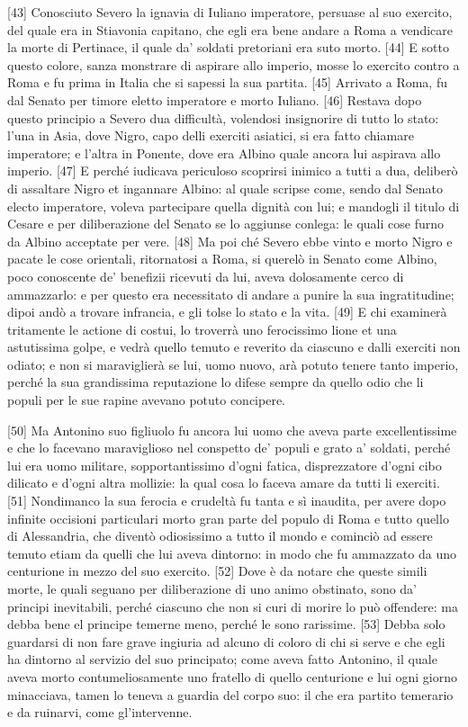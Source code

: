{[}43{]} Conosciuto Severo la ignavia di Iuliano imperatore, persuase al
suo exercito, del quale era in Stiavonia capitano, che egli era bene
andare a Roma a vendicare la morte di Pertinace, il quale da' soldati
pretoriani era suto morto. {[}44{]} E sotto questo colore, sanza
monstrare di aspirare allo imperio, mosse lo exercito contro a Roma e fu
prima in Italia che si sapessi la sua partita. {[}45{]} Arrivato a Roma,
fu dal Senato per timore eletto imperatore e morto Iuliano. {[}46{]}
Restava dopo questo principio a Severo dua difficultà, volendosi
insignorire di tutto lo stato: l'una in Asia, dove Nigro, capo delli
exerciti asiatici, si era fatto chiamare imperatore; e l'altra in
Ponente, dove era Albino quale ancora lui aspirava allo imperio.
{[}47{]} E perché iudicava periculoso scoprirsi inimico a tutti a dua,
deliberò di assaltare Nigro et ingannare Albino: al quale scripse come,
sendo dal Senato electo imperatore, voleva partecipare quella dignità
con lui; e mandogli il titulo di Cesare e per diliberazione del Senato
se lo aggiunse conlega: le quali cose furno da Albino acceptate per
vere. {[}48{]} Ma poi ché Severo ebbe vinto e morto Nigro e pacate le
cose orientali, ritornatosi a Roma, si querelò in Senato come Albino,
poco conoscente de' benefizii ricevuti da lui, aveva dolosamente cerco
di ammazzarlo: e per questo era necessitato di andare a punire la sua
ingratitudine; dipoi andò a trovare infrancia, e gli tolse lo stato e la
vita. {[}49{]} E chi examinerà tritamente le actione di costui, lo
troverrà uno ferocissimo lione et una astutissima golpe, e vedrà quello
temuto e reverito da ciascuno e dalli exerciti non odiato; e non si
maraviglierà se lui, uomo nuovo, arà potuto tenere tanto imperio, perché
la sua grandissima reputazione lo difese sempre da quello odio che li
populi per le sue rapine avevano potuto concipere.

{[}50{]} Ma Antonino suo figliuolo fu ancora lui uomo che aveva parte
excellentissime e che lo facevano maraviglioso nel conspetto de' populi
e grato a' soldati, perché lui era uomo militare, sopportantissimo
d'ogni fatica, disprezzatore d'ogni cibo dilicato e d'ogni altra
mollizie: la qual cosa lo faceva amare da tutti li exerciti. {[}51{]}
Nondimanco la sua ferocia e crudeltà fu tanta e sì inaudita, per avere
dopo infinite occisioni particulari morto gran parte del populo di Roma
e tutto quello di Alessandria, che diventò odiosissimo a tutto il mondo
e cominciò ad essere temuto etiam da quelli che lui aveva dintorno: in
modo che fu ammazzato da uno centurione in mezzo del suo exercito.
{[}52{]} Dove è da notare che queste simili morte, le quali seguano per
diliberazione di uno animo obstinato, sono da' principi inevitabili,
perché ciascuno che non si curi di morire lo può offendere: ma debba
bene el principe temerne meno, perché le sono rarissime. {[}53{]} Debba
solo guardarsi di non fare grave ingiuria ad alcuno di coloro di chi si
serve e che egli ha dintorno al servizio del suo principato; come aveva
fatto Antonino, il quale aveva morto contumeliosamente uno fratello di
quello centurione e lui ogni giorno minacciava, tamen lo teneva a
guardia del corpo suo: il che era partito temerario e da ruinarvi, come
gl'intervenne.

